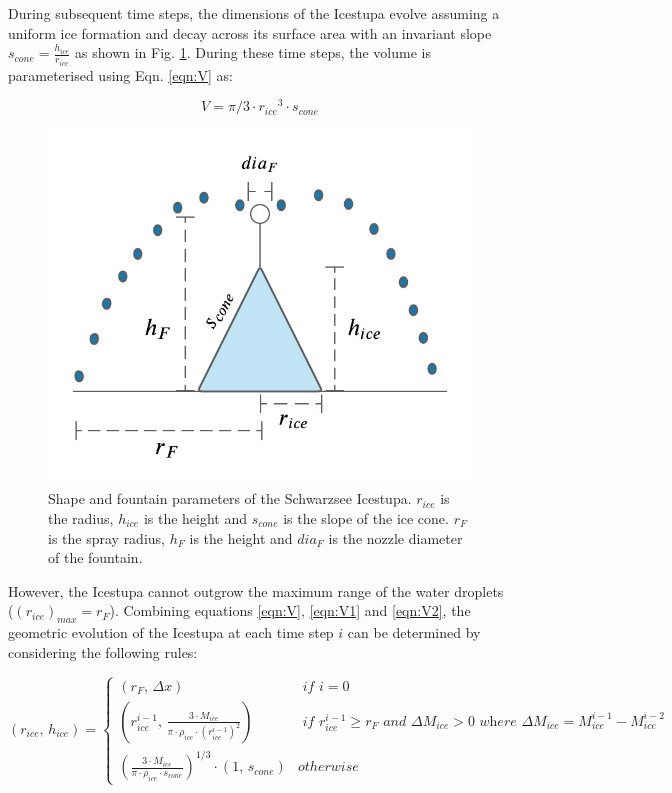 \documentclass[utf8]{frontiersSCNS} %
\begin{document}
During subsequent time steps, the dimensions of the Icestupa evolve assuming a uniform ice formation and decay across
its surface area with an invariant slope $s_{cone} = \frac{h_{ice}}{r_{ice}}$ as shown in Fig.  \ref{fig:shape}.
During these time steps, the volume is parameterised using Eqn. \ref{eqn:V} as:

\begin{equation} V = \pi/3 \cdot {r_{ice}}^3 \cdot s_{cone} \label{eqn:V2} \end{equation}

  \begin{figure} \begin{center} \includegraphics[width=10 cm]{Figures/Figure_5.jpg} \end{center} \caption{Shape and
fountain parameters of the Schwarzsee Icestupa. $r_{ice}$ is the radius, $h_{ice}$ is the height and $s_{cone}$ is the
slope of the ice cone. $r_F$ is the spray radius, $h_F$ is the height and $dia_F$ is the nozzle diameter of the
fountain.} \label{fig:shape} \end{figure}
  
However, the Icestupa cannot outgrow the maximum range of the water droplets ($(r_{ice})_{max} = r_{F}$). Combining
equations \ref{eqn:V}, \ref{eqn:V1} and \ref{eqn:V2}, the geometric evolution of the Icestupa at each time step $i$
can be determined by considering the following rules:

\begin{equation} (r_{ice},\, h_{ice}) = \left\{ \begin{array}{ll} (r_F ,\, \Delta x) & \textit{ if } i=0\\
    (r_{ice}^{i-1},\, \frac{3 \cdot M_{ice}}{\pi \cdot \rho_{ice} \cdot {(r_{ice}^{i-1})}^2}) & \textit{ if }
    r_{ice}^{i-1} \geq r_{F} \textit{ and } \Delta M_{ice} > 0 \textit{ where } \Delta M_{ice} = M_{ice}^{i-1} -
    M_{ice}^{i-2}\\ (\frac{3 \cdot M_{ice}}{\pi \cdot \rho_{ice} \cdot s_{cone}})^{1/3} \cdot (1,\,  s_{cone}) &
otherwise \end{array} \right.  \label{eqn:A2} \end{equation}
\end{document}
